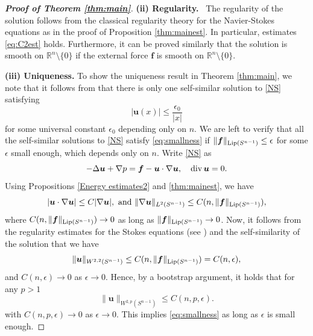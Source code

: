 \documentclass[12pt]{amsart}
\renewcommand{\div}{{\rm div \thinspace }}
\newcommand{\Bu}{{\boldsymbol{u}}}
\newcommand{\Bf}{{\boldsymbol{f}}}
\begin{document}
\begin{proof}[{\bf Proof of Theorem \ref{thm:main}}]
	{\bf (ii) Regularity. }\ The regularity of the solution follows from the classical regularity theory for the Navier-Stokes equations as in the proof of Proposition \ref{thm:mainest}. In particular, estimates \eqref{eq:C2est} holds. Furthermore, it can be proved similarly that the solution is smooth on $\mathbb{R}^n\setminus\{0\}$ if the external force $\Bf$ is smooth on $\mathbb{R}^n\setminus\{0\}$.
	
	{\bf (iii) Uniqueness.}
	To show the  uniqueness result in Theorem \ref{thm:main}, we note that it follows from  \cite[Theorem 1.2]{Kaneko19} that there is only one self-similar solution to \eqref{NS} satisfying  
	\begin{equation}\label{eq:smallness}
		|\Bu(x)| \leq \frac{\epsilon_0}{|x|}
	\end{equation}
	for some universal constant $\epsilon_0$ depending only on $n$.
	We are left to verify that all the self-similar solutions to \eqref{NS} satisfy \eqref{eq:smallness} if $\| \Bf \|_{\textnormal{Lip}(S^{n-1})} \leq \epsilon$ for some $\epsilon$ small enough, which depends only on $n$.
	Write  \eqref{NS} as
	\begin{equation*}
		-\Delta \Bu + \nabla p=  \Bf-\Bu \cdot \nabla \Bu, \quad \div \Bu=0.
	\end{equation*}
	Using Propositions \ref{Energy estimates2} and \ref{thm:mainest}, we have
	$$|\Bu \cdot \nabla \Bu|\leq C |\nabla \Bu|, \textrm{ and } \|\nabla \Bu\|_{L^2(S^{n-1})}\leq C(n, \|\Bf\|_{\textnormal{Lip}(S^{n-1})}),$$ where $C(n, \|\Bf\|_{\textnormal{Lip}(S^{n-1})})\to 0$ as long as $\|\Bf\|_{\textnormal{Lip}(S^{n-1})}\to 0$. Now, it follows from the regularity estimates for the Stokes equations (see \cite[Lemma 2.12]{Tsai18}) and the self-similarity of the solution that we have
	\begin{equation*}
		\|\Bu\|_{W^{2,2}(S^{n-1})}\leq C(n,\|\Bf\|_{\textnormal{Lip}(S^{n-1})})= C(n,\epsilon),
	\end{equation*}
	and  $C(n,\epsilon)\to0$ as $\epsilon\to 0$.
	Hence, by a bootstrap argument, it holds that for any $p>1$
	\begin{equation*}
		\|\Bu\|_{W^{2,p}(S^{n-1})}\leq C(n, p, \epsilon).
	\end{equation*}
	with  $C(n, p, \epsilon)\to 0$ as $\epsilon \to 0$. This implies \eqref{eq:smallness} as long as $\epsilon$ is small enough.
\end{proof}
\end{document}
